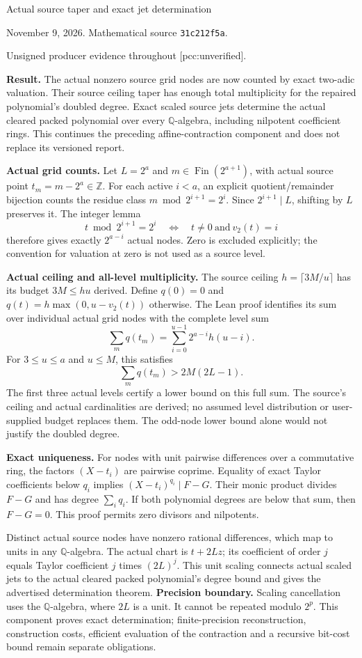 \documentclass[11pt]{article}
\begin{document}
{\LARGE Actual source taper and exact jet determination}\par
November 9, 2026. Mathematical source \texttt{31c212f5a}.\par
Unsigned producer evidence throughout [pcc:unverified].

\textbf{Result.}
The actual nonzero source grid nodes are now counted by exact two-adic
valuation. Their source ceiling taper has enough total multiplicity for
the repaired polynomial's doubled degree. Exact scaled source jets determine
the actual cleared packed polynomial over every $\mathbb Q$-algebra, including
nilpotent coefficient rings. This continues the preceding affine-contraction
component and does not replace its versioned report.

\textbf{Actual grid counts.}
Let $L=2^a$ and $m\in\operatorname{Fin}(2^{a+1})$, with actual source point
$t_m=m-2^a\in\mathbb Z$. For each active $i<a$, an explicit quotient/remainder
bijection counts the residue class $m\bmod 2^{i+1}=2^i$. Since $2^{i+1}\mid L$,
shifting by $L$ preserves it. The integer lemma
\[
 t\bmod 2^{i+1}=2^i\quad\Longleftrightarrow\quad
 t\ne0\ \text{and}\ v_2(t)=i
\]
therefore gives exactly $2^{a-i}$ actual nodes. Zero is excluded explicitly;
the convention for valuation at zero is not used as a source level.

\textbf{Actual ceiling and all-level multiplicity.}
The source ceiling $h=\lceil3M/u\rceil$ has its budget $3M\leq hu$ derived.
Define $q(0)=0$ and $q(t)=h\max(0,u-v_2(t))$ otherwise. The Lean proof identifies
its sum over individual actual grid nodes with the complete level sum
\[
 \sum_m q(t_m)=\sum_{i=0}^{u-1}2^{a-i}h(u-i).
\]
For $3\leq u\leq a$ and $u\leq M$, this satisfies
\[
 \sum_m q(t_m)>2M(2L-1).
\]
The first three actual levels certify a lower bound on this full sum.
The source's ceiling and actual cardinalities are derived; no assumed
level distribution or user-supplied budget replaces them. The odd-node lower
bound alone would not justify the doubled degree.

\textbf{Exact uniqueness.}
For nodes with unit pairwise differences over a commutative ring, the factors
$(X-t_i)$ are pairwise coprime. Equality of exact Taylor coefficients below
$q_i$ implies $(X-t_i)^{q_i}\mid F-G$. Their monic product divides $F-G$ and
has degree $\sum_iq_i$. If both polynomial degrees are below that sum, then
$F-G=0$. This proof permits zero divisors and nilpotents.

Distinct actual source nodes have nonzero rational differences, which map to
units in any $\mathbb Q$-algebra. The actual chart is $t+2Lz$; its coefficient
of order $j$ equals Taylor coefficient $j$ times $(2L)^j$. This unit scaling
connects actual scaled jets to the actual cleared packed polynomial's degree
bound and gives the advertised determination theorem.
\newpage
\textbf{Precision boundary.}
Scaling cancellation uses the $\mathbb Q$-algebra, where $2L$ is a unit.
It cannot be repeated modulo $2^p$. This component proves exact determination;
finite-precision reconstruction, construction costs, efficient evaluation of
the contraction and a recursive bit-cost bound remain separate obligations.
\end{document}
